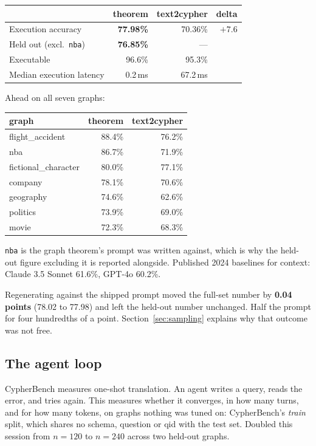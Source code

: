 \documentclass[11pt]{article}
\begin{document}
\begin{center}
\begin{tabular}{lrrr}
\toprule
 & theorem & text2cypher & delta \\
\midrule
Execution accuracy      & \textbf{77.98\%} & 70.36\% & $+7.6$ \\
Held out (excl.\ \texttt{nba}) & \textbf{76.85\%} & --- & \\
Executable              & 96.6\%  & 95.3\%  & \\
Median execution latency & 0.2\,ms & 67.2\,ms & \\
\bottomrule
\end{tabular}
\end{center}

\noindent Ahead on all seven graphs:

\begin{center}
\begin{tabular}{lrr}
\toprule
graph & theorem & text2cypher \\
\midrule
flight\_accident     & 88.4\% & 76.2\% \\
nba                  & 86.7\% & 71.9\% \\
fictional\_character & 80.0\% & 77.1\% \\
company              & 78.1\% & 70.6\% \\
geography            & 74.6\% & 62.6\% \\
politics             & 73.9\% & 69.0\% \\
movie                & 72.3\% & 68.3\% \\
\bottomrule
\end{tabular}
\end{center}

\texttt{nba} is the graph theorem's prompt was written against, which is why the
held-out figure excluding it is reported alongside. Published 2024 baselines for
context: Claude 3.5 Sonnet 61.6\%, GPT-4o 60.2\%.

Regenerating against the shipped prompt moved the full-set number by
\textbf{0.04 points} (78.02 to 77.98) and left the held-out number unchanged.
Half the prompt for four hundredths of a point. Section~\ref{sec:sampling}
explains why that outcome was not free.

\subsection{The agent loop}

CypherBench measures one-shot translation. An agent writes a query, reads the
error, and tries again. This measures whether it converges, in how many turns,
and for how many tokens, on graphs nothing was tuned on: CypherBench's
\emph{train} split, which shares no schema, question or qid with the test set.
Doubled this session from $n=120$ to $n=240$ across two held-out graphs.
\end{document}
